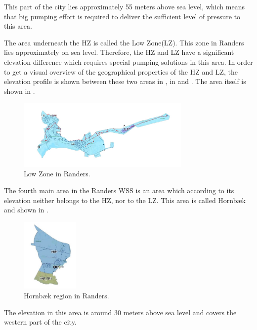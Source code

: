 This part of the city lies approximately 55 meters above sea level, which means that big pumping effort is required to deliver the sufficient level of pressure to this area. 

The area underneath the HZ is called the Low Zone(LZ). This zone in Randers lies approximately on sea level. Therefore, the HZ and LZ have a significant elevation difference which requires special pumping solutions in this area. In order to get a visual overview of the geographical properties of the HZ and LZ, the elevation profile is shown between these two areas in , in  and . The area itself is shown in .

\begin{figure}[H]
\centering
\includegraphics[width=0.75\textwidth]{report/pictures/Lowzone_region}
\caption{Low Zone in Randers.}
\label{fig:lowzone_region}
\end{figure}

The fourth main area in the Randers WSS is an area which according to its elevation neither belongs to the HZ, nor to the LZ. This area is called Hornbæk and shown in .

\begin{figure}[H]
\centering
\includegraphics[width=0.25\textwidth]{report/pictures/Hornbaek_region}
\caption{Hornbæk region in Randers.}
\label{fig:hornbaek_region}
\end{figure}

The elevation in this area is around 30 meters above sea level and covers the western part of the city.  

